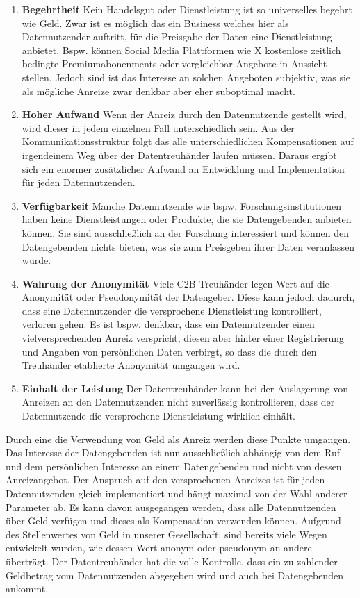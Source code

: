 \documentclass[11pt,a4paper]{scrreprt}
\begin{document}
\begin{enumerate}
    \item \textbf{Begehrtheit} Kein Handelsgut oder Dienstleistung ist so universelles begehrt wie Geld. Zwar ist es möglich das ein Business welches hier als Datennutzender auftritt, für die Preisgabe der Daten eine Dienstleistung anbietet. Bspw. können Social Media Plattformen wie X kostenlose zeitlich bedingte Premiumabonenments oder vergleichbar Angebote in Aussicht stellen. Jedoch sind ist das Interesse an solchen Angeboten subjektiv, was sie als mögliche Anreize zwar denkbar aber eher suboptimal macht.
    \item \textbf{Hoher Aufwand} Wenn der Anreiz durch den Datennutzende gestellt wird, wird dieser in jedem einzelnen Fall unterschiedlich sein. Aus der Kommunikationsstruktur folgt das alle unterschiedlichen Kompensationen auf irgendeinem Weg über der Datentreuhänder laufen müssen. Daraus ergibt sich ein enormer zusätzlicher Aufwand an Entwicklung und Implementation für jeden Datennutzenden.
    \item \textbf{Verfügbarkeit} Manche Datennutzende wie bspw. Forschungsinstitutionen haben keine Dienstleistungen oder Produkte, die sie Datengebenden anbieten können. Sie sind ausschließlich an der Forschung interessiert und können den Datengebenden nichts bieten, was sie zum Preisgeben ihrer Daten veranlassen würde.
    \item \textbf{Wahrung der Anonymität} Viele C2B Treuhänder legen Wert auf die Anonymität oder Pseudonymität der Datengeber. Diese kann jedoch dadurch, dass eine Datennutzender die versprochene Dienstleistung kontrolliert, verloren gehen. Es ist bspw. denkbar, dass ein Datennutzender einen vielversprechenden Anreiz verspricht, diesen aber hinter einer Registrierung und Angaben von persönlichen Daten verbirgt, so dass die durch den Treuhänder etablierte Anonymität umgangen wird.
    \item \textbf{Einhalt der Leistung} Der Datentreuhänder kann bei der Auslagerung von Anreizen an den Datennutzenden nicht zuverlässig kontrollieren, dass der Datennutzende die versprochene Dienstleistung wirklich einhält.
\end{enumerate}
Durch eine die Verwendung von Geld als Anreiz werden diese Punkte umgangen. Das Interesse der Datengebenden ist nun ausschließlich abhängig von dem Ruf und dem persönlichen Interesse an einem Datengebenden und nicht von dessen Anreizangebot. Der Anspruch auf den versprochenen Anreizes ist für jeden Datennutzenden gleich implementiert und hängt maximal von der Wahl anderer Parameter ab. Es kann davon ausgegangen werden, dass alle Datennutzenden über Geld verfügen und dieses als Kompensation verwenden können. Aufgrund des Stellenwertes von Geld in unserer Gesellschaft, sind bereits viele Wegen entwickelt wurden, wie dessen Wert anonym oder pseudonym an andere überträgt. Der Datentreuhänder hat die volle Kontrolle, dass ein zu zahlender Geldbetrag vom Datennutzenden abgegeben wird und auch bei Datengebenden ankommt.
\end{document}
